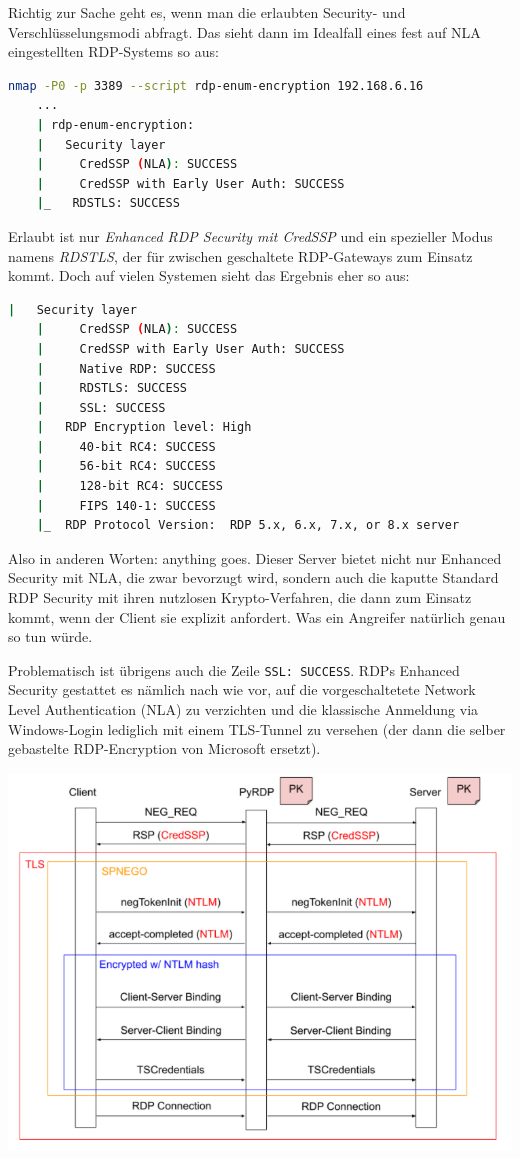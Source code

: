 Richtig zur Sache geht es, wenn man die erlaubten Security- und Verschlüsselungsmodi abfragt. Das sieht dann im Idealfall eines fest auf NLA eingestellten RDP-Systems so aus:

\begin{lstlisting}[language=bash]
    nmap -P0 -p 3389 --script rdp-enum-encryption 192.168.6.16
    ...
    | rdp-enum-encryption:
    |   Security layer
    |     CredSSP (NLA): SUCCESS
    |     CredSSP with Early User Auth: SUCCESS
    |_   RDSTLS: SUCCESS
\end{lstlisting}

Erlaubt ist nur \textit{Enhanced RDP Security mit CredSSP} und ein spezieller Modus namens \textit{RDSTLS}, der für zwischen geschaltete RDP-Gateways zum Einsatz kommt. Doch auf vielen Systemen sieht das Ergebnis eher so aus:

\begin{lstlisting}[language=bash]
    |   Security layer
    |     CredSSP (NLA): SUCCESS
    |     CredSSP with Early User Auth: SUCCESS
    |     Native RDP: SUCCESS
    |     RDSTLS: SUCCESS
    |     SSL: SUCCESS
    |   RDP Encryption level: High
    |     40-bit RC4: SUCCESS
    |     56-bit RC4: SUCCESS
    |     128-bit RC4: SUCCESS
    |     FIPS 140-1: SUCCESS
    |_  RDP Protocol Version:  RDP 5.x, 6.x, 7.x, or 8.x server
\end{lstlisting}

Also in anderen Worten: \glqq anything goes\grqq. Dieser Server bietet nicht nur Enhanced Security mit NLA, die zwar bevorzugt wird, sondern auch die kaputte Standard RDP Security mit ihren nutzlosen Krypto-Verfahren, die dann zum Einsatz kommt, wenn der Client sie explizit anfordert. Was ein Angreifer natürlich genau so tun würde.

Problematisch ist übrigens auch die Zeile \lstinline|SSL: SUCCESS|. RDPs Enhanced Security gestattet es nämlich nach wie vor, auf die vorgeschaltetete Network Level Authentication (NLA) zu verzichten und die klassische Anmeldung via Windows-Login lediglich mit einem TLS-Tunnel zu versehen (der dann die selber gebastelte RDP-Encryption von Microsoft ersetzt).

\begin{center}
    \vspace{-8pt}
    \includegraphics[width=1.0\linewidth]{./img/09-mitm/mitm_rdp}
    \vspace{-8pt}
\end{center}